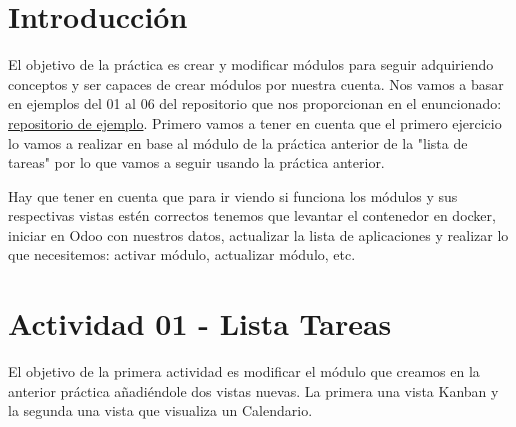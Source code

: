\documentclass[a4paper,12pt]{article}
\begin{document}
\section{Introducción}

El objetivo de la práctica es crear y modificar módulos para seguir adquiriendo conceptos y ser capaces de crear módulos por nuestra cuenta. Nos vamos a basar en ejemplos del 01 al 06 del repositorio que nos proporcionan en el enuncionado: \href{https://github.com/sergarb1/OdooModulosEjemplos}{repositorio de ejemplo}. Primero vamos a tener en cuenta que el primero ejercicio lo vamos a realizar en base al módulo de la práctica anterior de la "lista de tareas" por lo que vamos a seguir usando la práctica anterior.

Hay que tener en cuenta que para ir viendo si funciona los módulos y sus respectivas vistas estén correctos tenemos que levantar el contenedor en docker, iniciar en Odoo con nuestros datos, actualizar la lista de aplicaciones y realizar lo que necesitemos: activar módulo, actualizar módulo, etc.


\section{Actividad 01 - Lista Tareas}
El objetivo de la primera actividad es modificar el módulo que creamos en la anterior práctica añadiéndole dos vistas nuevas. La primera una vista Kanban y la segunda una vista que visualiza un Calendario.
\end{document}
